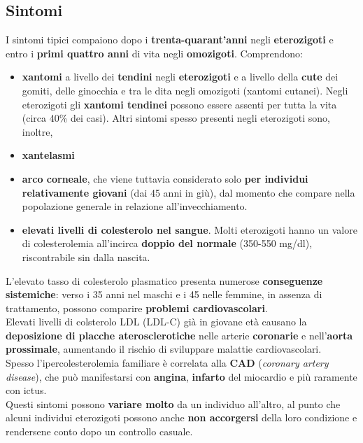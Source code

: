 \documentclass[a4paper, 12pt]{article}
\begin{document}
\begin{titlepage}
\subsection{Sintomi}
I sintomi tipici compaiono dopo i \textbf{trenta-quarant’anni} negli \textbf{eterozigoti} e entro i \textbf{primi quattro anni} di vita negli \textbf{omozigoti}. Comprendono:
\begin{itemize}
\item \textbf{xantomi} a livello dei \textbf{tendini} negli \textbf{eterozigoti} e a livello della \textbf{cute} dei gomiti, delle ginocchia e tra le dita negli omozigoti (xantomi cutanei). Negli eterozigoti gli \textbf{xantomi tendinei} possono essere assenti per tutta la vita (circa 40\% dei casi). Altri sintomi spesso presenti negli eterozigoti sono, inoltre, 
\item \textbf{xantelasmi}
\item \textbf{arco corneale}, che viene tuttavia considerato solo \textbf{per individui relativamente giovani} (dai 45 anni in giù), dal momento che compare nella popolazione generale in relazione all’invecchiamento.
\item \textbf{elevati livelli di colesterolo nel sangue}. Molti eterozigoti hanno un valore di colesterolemia all’incirca \textbf{doppio del normale} (350-550 mg/dl), riscontrabile sin dalla nascita.
\end{itemize}
L'elevato tasso di colesterolo plasmatico presenta numerose \textbf{conseguenze sistemiche}: verso i 35 anni nel maschi e i 45 nelle femmine, in assenza di trattamento, possono comparire \textbf{problemi cardiovascolari}.\\
Elevati livelli di colsterolo LDL (LDL-C) già in giovane età causano la \textbf{deposizione di placche aterosclerotiche} nelle arterie \textbf{coronarie} e nell’\textbf{aorta prossimale}, aumentando il rischio di sviluppare malattie cardiovascolari.\\
Spesso l’ipercolesterolemia familiare è correlata alla \textbf{CAD} (\textit{coronary artery disease}), che può manifestarsi con \textbf{angina}, \textbf{infarto} del miocardio e più raramente con ictus.\\
Questi sintomi possono \textbf{variare molto} da un individuo all’altro, al punto che alcuni individui eterozigoti possono anche \textbf{non accorgersi} della loro condizione e rendersene conto dopo un controllo casuale.\\

\end{titlepage}
\end{document}
